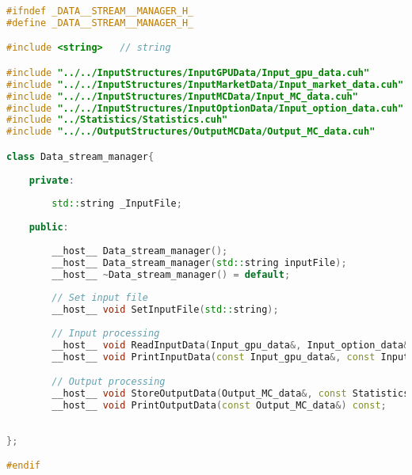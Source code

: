 \begin{lstlisting}[language=C++, caption={\texttt{libraries/CoreLibraries/DataStreamManager/Data\_stream\_manager.cuh}}]
#ifndef _DATA__STREAM__MANAGER_H_
#define _DATA__STREAM__MANAGER_H_

#include <string>	// string

#include "../../InputStructures/InputGPUData/Input_gpu_data.cuh"
#include "../../InputStructures/InputMarketData/Input_market_data.cuh"
#include "../../InputStructures/InputMCData/Input_MC_data.cuh"
#include "../../InputStructures/InputOptionData/Input_option_data.cuh"
#include "../Statistics/Statistics.cuh"
#include "../../OutputStructures/OutputMCData/Output_MC_data.cuh"

class Data_stream_manager{
	
	private:
	
		std::string _InputFile;
	
	public:
	
		__host__ Data_stream_manager();
		__host__ Data_stream_manager(std::string inputFile);
		__host__ ~Data_stream_manager() = default;
		
		// Set input file
		__host__ void SetInputFile(std::string);
	
		// Input processing
		__host__ void ReadInputData(Input_gpu_data&, Input_option_data&, Input_market_data&, Input_MC_data&) const;
		__host__ void PrintInputData(const Input_gpu_data&, const Input_option_data&, const Input_market_data&, const Input_MC_data&) const;

		// Output processing
		__host__ void StoreOutputData(Output_MC_data&, const Statistics exactResults, const Statistics eulerResults, double elapsedTime, char hostOrDevice) const;
		__host__ void PrintOutputData(const Output_MC_data&) const;		
		
	
};

#endif
\end{lstlisting}

